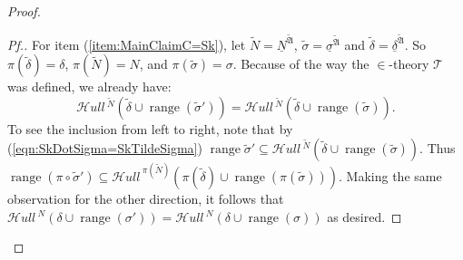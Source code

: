 \documentclass{amsart}
\theoremstyle{definition}
\theoremstyle{remark}
\newcommand{\N}{{\overline{N}}}
\DeclareMathOperator{\ran}{range}
\newcommand{\SH}{\mathcal{H}\textit{ull} \,}
\newcommand{\sk}[3]{\SH^{#1}( {#2} \cup {\ran(#3)} ) }
\newcommand{\Sk}[3]{\SH^{#1}( {#2} \cup {#3} ) }
\begin{document}
\begin{proof}
\begin{proof}[Pf.]
For item (\ref{item:MainClaimC=Sk}), let $\tilde N = \underline N^{\tilde{\mathfrak A}}$, $\tilde \sigma = \underline \sigma^{\tilde{\mathfrak A}}$ and $\tilde \delta = \underline{\delta}^{\tilde{\mathfrak A}}$. So $\pi(\tilde \delta)= \delta$, $\pi(\tilde N)=N$, and $\pi(\tilde \sigma)=\sigma$. Because of the way the $\in$-theory $\mathcal T$ was defined, we already have: 
\begin{equation} \tag{$\star$} \label{eqn:SkDotSigma=SkTildeSigma} \sk{\tilde N}{\tilde \delta}{\tilde \sigma'} = \sk{\tilde N}{\tilde \delta}{\tilde \sigma}. \end{equation} To see the inclusion from left to right, note that by (\ref{eqn:SkDotSigma=SkTildeSigma}) $\ran{\tilde \sigma'} \subseteq \sk{\tilde N}{\tilde \delta}{\tilde \sigma}$. Thus 
	$\ran(\pi \circ \tilde \sigma') \subseteq \sk{\pi(\tilde N)}{\pi(\tilde \delta)}{\pi(\tilde\sigma)}.$
Making the same observation for the other direction, it follows that
$\sk{N}{\delta}{\sigma'} = \sk{N}{\delta}{\sigma}$ as desired.


\end{proof}
\end{proof}
\end{document}

